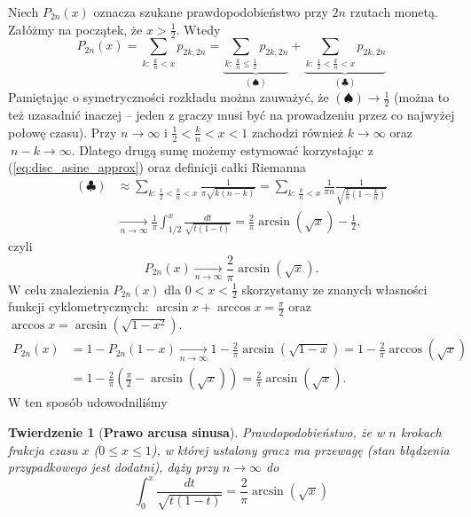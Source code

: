 \documentclass[a4paper,11pt,oneside]{book}
\newcommand{\conv}{\rightarrow}
\newcommand{\Conv}{\longrightarrow}
\newtheorem{twier}{Twierdzenie}[chapter]
\theoremstyle{definition}
\begin{document}
Niech $P_{2n}(x)$ oznacza szukane prawdopodobieństwo przy $2n$ rzutach monetą. Załóżmy na początek, że $x > \frac{1}{2}$. Wtedy
\[ P_{2n}(x) = \sum_{k:\ \frac{k}{n} < x} p_{2k,2n} = \underbrace{\sum_{k:\ \frac{k}{n} \leq \frac{1}{2}} p_{2k,2n}}_{(\spadesuit)} + \underbrace{\sum_{k:\ \frac{1}{2} < \frac{k}{n} < x} p_{2k,2n}}_{(\clubsuit)}  \]
Pamiętając o symetryczności rozkładu można zauważyć, że $(\spadesuit) \Conv \frac{1}{2}$ (można to też uzasadnić inaczej -- jeden z graczy musi być na prowadzeniu przez co najwyżej połowę czasu). Przy $n \conv \infty$ i $\frac{1}{2} < \frac{k}{n} < x < 1$ zachodzi również $k \Conv \infty$ oraz $\ n-k \Conv \infty$. Dlatego drugą sumę możemy estymować korzystając z (\ref{eq:disc_asine_approx}) oraz definicji całki Riemanna
\begin{equation*}
 \begin{split}
 (\clubsuit) &\approx \sum_{k:\ \frac{1}{2} < \frac{k}{n} < x} \frac{1}{\pi \sqrt{k(n-k)}} =  \sum_{k:\ \frac{k}{n} < x} \frac{1}{\pi n} \frac{1}{ \sqrt{\frac{k}{n} (1 - \frac{k}{n})} } \\
 &\xrightarrow[n \conv \infty]{} \frac{1}{\pi} \int_{1/2}^x \frac{dt}{\sqrt{t(1-t)}} = \frac{2}{\pi}\arcsin(\sqrt{x}) - \frac{1}{2},
 \end{split}
\end{equation*}
czyli
\[  P_{2n}(x) \xrightarrow[n \conv \infty]{} \frac{2}{\pi}\arcsin(\sqrt{x}). \]
W celu znalezienia $P_{2n}(x)$ dla $0 < x < \frac{1}{2}$ skorzystamy ze znanych własności funkcji cyklometrycznych: $\arcsin x + \arccos x = \frac{\pi}{2}$ oraz $\arccos x = \arcsin(\sqrt{1-x^2})$.
\begin{equation*}
 \begin{split}
  P_{2n}(x) &= 1 - P_{2n}(1-x) \xrightarrow[n \conv \infty]{} 1 - \frac{2}{\pi} \arcsin(\sqrt{1-x}) = 1 - \frac{2}{\pi} \arccos(\sqrt{x}) \\
  &= 1 - \frac{2}{\pi} \left( \frac{\pi}{2} - \arcsin(\sqrt{x}) \right) = \frac{2}{\pi}\arcsin(\sqrt{x}).
 \end{split}
\end{equation*}
W ten sposób udowodniliśmy
\begin{twier}[\textbf{Prawo arcusa sinusa}]
 Prawdopodobieństwo, że w $n$ krokach frakcja czasu $x$ ($0 \leq x \leq 1$), w której ustalony gracz ma przewagę (stan błądzenia przypadkowego jest dodatni), dąży przy $n \Conv \infty$ do
 \[  \int_0^x \frac{dt}{\sqrt{t(1-t)}} = \frac{2}{\pi}\arcsin(\sqrt{x}) \]
\end{twier}
\end{document}
